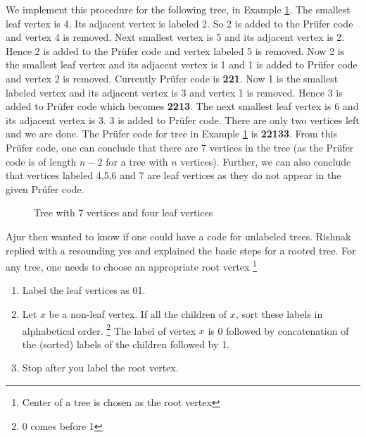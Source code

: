 We implement this procedure for the following tree, in Example \ref{8g5}. The smallest leaf vertex is 4. Its adjacent vertex is labeled 2. So 2 is added to the Pr{\"u}fer code and vertex 4 is removed. Next smallest vertex is 5 and its adjacent vertex is 2. Hence 2 is added to the Pr{\"u}fer code and vertex labeled 5 is removed. Now 2 is the smallest leaf vertex and its adjacent vertex is 1 and  1 is added to Pr{\"u}fer code and vertex 2 is removed. Currently Pr{\"u}fer code is \textbf{221}. Now 1 is the smallest labeled vertex and its adjacent vertex is 3 and vertex 1 is removed. Hence 3 is added to Pr{\"u}fer code which becomes \textbf{2213}. The next smallest leaf vertex is 6 and its adjacent vertex is 3. 3 is added to Pr{\"u}fer code. There are only two vertices left and we are done. The Pr{\"u}fer code for tree in Example \ref{8g5} is \textbf{22133}. From this Pr{\"u}fer code, one can conclude that there are 7 vertices in the tree (as the Pr{\"u}fer code is of length $n-2$ for a tree with $n$ vertices). Further, we can also conclude that vertices labeled 4,5,6 and 7 are leaf vertices as they do not appear in the given Pr{\'u}fer code. 
\begin{figure}
\begin{center}


\caption{Tree with 7 vertices and four leaf vertices }\label{8g5}
\end{center}
\end{figure}

Ajur then wanted to know if one could have a code for unlabeled trees. Rishnak replied with a resounding yes and explained the basic steps for a rooted tree. For any tree, one needs to choose an appropriate root vertex \footnote{Center of a tree is chosen as the root vertex}  %
\begin{enumerate}
    \item  Label the leaf vertices as 01.
    \item Let $x$ be a non-leaf vertex. If all the children of $x$, sort these labels in alphabetical order. \footnote{0 comes before 1} The label of vertex $x$ is 0 followed by concatenation of the (sorted) labels of the children followed by 1.
    \item Stop after you label the root vertex.
\end{enumerate}

